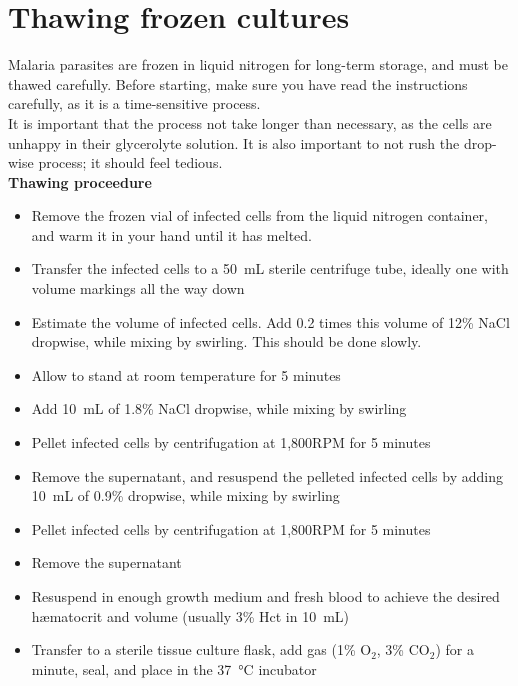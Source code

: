 \documentclass{article}
\begin{document}
\section{Thawing frozen cultures}

Malaria parasites are frozen in liquid nitrogen for long-term storage, and must be thawed carefully. Before starting, make sure you have read the instructions carefully, as it is a time-sensitive process.\\

It is important that the process not take longer than necessary, as the cells are unhappy in their glycerolyte solution. It is also important to not rush the drop-wise process; it should feel tedious.\\

\textbf{Thawing proceedure}\\

\begin{itemize}
	\item Remove the frozen vial of infected cells from the liquid nitrogen container, and warm it in your hand until it has melted.
	\item Transfer the infected cells to a \SI{50}{mL} sterile centrifuge tube, ideally one with volume markings all the way down
	\item Estimate the volume of infected cells. Add 0.2 times this volume of 12\% NaCl dropwise, while mixing by swirling. This should be done slowly.
	\item Allow to stand at room temperature for 5 minutes
	\item Add \SI{10}{mL} of 1.8\% NaCl dropwise, while mixing by swirling
	\item Pellet infected cells by centrifugation at 1,800RPM for 5 minutes
	\item Remove the supernatant, and resuspend the pelleted infected cells by adding \SI{10}{mL} of 0.9\% dropwise, while mixing by swirling
	\item Pellet infected cells by centrifugation at 1,800RPM for 5 minutes
	\item Remove the supernatant
	\item Resuspend in enough growth medium and fresh blood to achieve the desired h{\ae}matocrit and volume (usually 3\% Hct in \SI{10}{mL})
	\item Transfer to a sterile tissue culture flask, add gas (1\% O$_2$, 3\% CO$_2$) for a minute, seal, and place in the \SI{37}{\celsius} incubator
\end{itemize}
\end{document}

